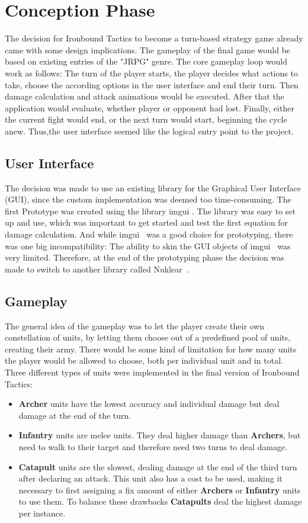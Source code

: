 \documentclass[conference]{IEEEtran}
\begin{document}
\section{Conception Phase}
The decision for Ironbound Tactics to become a turn-based strategy game already came with some design implications.
The gameplay of the final game would be based on existing entries of the "JRPG" genre.
The core gameplay loop would work as follows: The turn of the player starts, the player decides what actions to take,
choose the according options in the user interface and end their turn.
Then damage calculation and attack animations would be executed.
After that the application would evaluate, whether player or opponent had lost.
Finally, either the current fight would end, or the next turn would start, beginning the cycle anew.
Thus,the user interface seemed like the logical entry point to the project.

\subsection{User Interface}
The decision was made to use an existing library for the Graphical User Interface (GUI), since the custom
implementation was deemed too time-consuming.
The first Prototype was created using the library imgui \cite{b2}.
The library was easy to set up and use, which was important to get started and test the first equation for damage
calculation.
And while imgui~\cite{b2} was a good choice for prototyping, there was one big incompatibility: The ability to skin
the GUI objects of imgui~\cite{b2} was very limited.
Therefore, at the end of the prototyping phase the decision was made to switch to another library called Nuklear~\cite{b3}.

\subsection{Gameplay}
The general idea of the gameplay was to let the player create their own constellation of units, by letting them choose
out of a predefined pool of units, creating their army.
There would be some kind of limitation for how many units the player would be allowed to choose, both per individual
unit and in total.
Three different types of units were implemented in the final version of Ironbound Tactics:
\begin{itemize}
    \item \textbf{Archer} units have the lowest accuracy and individual damage but deal damage at the end of the turn.
    \item \textbf{Infantry} units are melee units.
    They deal higher damage than \textbf{Archers}, but need to walk to their target and therefore need two turns to
    deal damage.
    \item \textbf{Catapult} units are the slowest, dealing damage at the end of the third turn after declaring an attack.
    This unit also has a cost to be used, making it necessary to first assigning a fix amount of either \textbf{Archers}
    or \textbf{Infantry} units to use them.
    To balance these drawbacks \textbf{Catapults} deal the highest damage per instance.
\end{itemize}
\end{document}
